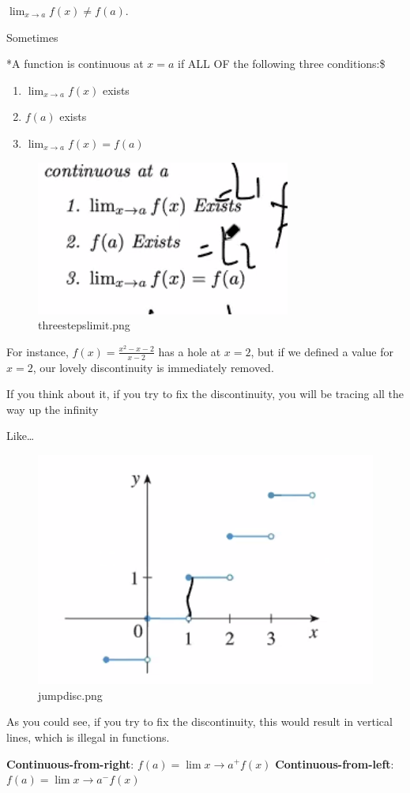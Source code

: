 \documentclass[letterpaper]{article}
\begin{document}
\(\lim_{x \to a} f(x) \neq f(a)\).

Sometimes

*A function is continuous at \(x=a\) if ALL OF the following three
conditions:\$

\begin{enumerate}
\item \(\lim_{x\to a} f(x)\) exists
\item \(f(a)\) exists
\item \(\lim_{x\to a} f(x) = f(a)\)
\end{enumerate}

\begin{figure}[htbp]
\centering
\includegraphics[width=.9\linewidth]{threestepslimit.png}
\caption{threestepslimit.png}
\end{figure}

For instance, \(f(x) = \frac{x^2-x-2}{x-2}\) has a hole at \(x=2\), but
if we defined a value for \(x=2\), our lovely discontinuity is
immediately removed.

If you think about it, if you try to fix the discontinuity, you will be
tracing all the way up the infinity

Like\ldots{}

\begin{figure}[htbp]
\centering
\includegraphics[width=.9\linewidth]{jumpdisc.png}
\caption{jumpdisc.png}
\end{figure}

As you could see, if you try to fix the discontinuity, this would result
in vertical lines, which is illegal in functions.

\textbf{Continuous-from-right}: \(f(a) = \lim{x \to a^+} f(x)\)
\textbf{Continuous-from-left}: \(f(a) = \lim{x \to a^-} f(x)\)
\end{document}
